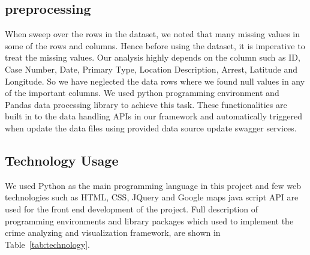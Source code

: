 \subsection{preprocessing}

When sweep over the rows in the dataset, we noted that many missing
values in some of the rows and columns. Hence before using the
dataset, it is imperative to treat the missing values. Our analysis
highly depends on the column such as ID, Case Number, Date, Primary
Type, Location Description, Arrest, Latitude and Longitude. So we have
neglected the data rows where we found null values in any of the
important columns. We used python programming environment and Pandas
data processing library to achieve this task. These functionalities
are built in to the data handling APIs in our framework and
automatically triggered when update the data files using provided data
source update swagger services.

\subsection{Technology Usage}

We used Python as the main programming language in this project and
few web technologies such as HTML, CSS, JQuery and Google maps java
script API are used for the front end development of the project. Full
description of programming environments and library packages which
used to implement the crime analyzing and visualization framework, are
shown in Table~\ref{tab:technology}.

